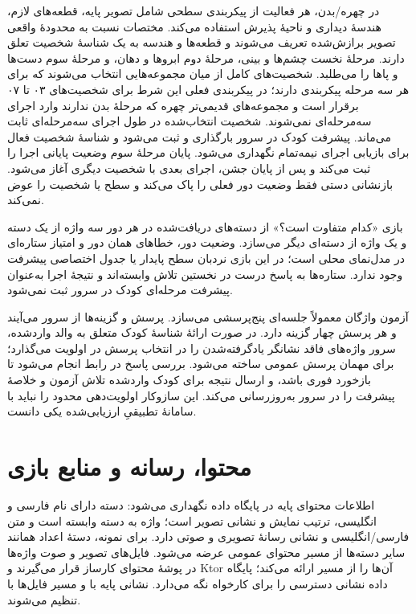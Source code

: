 در چهره/بدن، هر فعالیت از پیکربندی سطحی شامل تصویر پایه، قطعه‌های لازم، هندسهٔ دیداری و ناحیهٔ پذیرش استفاده می‌کند. مختصات نسبت به محدودهٔ واقعی تصویر برازش‌شده تعریف می‌شوند و قطعه‌ها و هندسه به یک شناسهٔ شخصیت تعلق دارند. مرحلهٔ نخست چشم‌ها و بینی، مرحلهٔ دوم ابروها و دهان، و مرحلهٔ سوم دست‌ها و پاها را می‌طلبد. شخصیت‌های کامل از میان مجموعه‌هایی انتخاب می‌شوند که برای هر سه مرحله پیکربندی دارند؛ در پیکربندی فعلی این شرط برای شخصیت‌های ۰۳ تا ۰۷ برقرار است و مجموعه‌های قدیمی‌تر چهره که مرحلهٔ بدن ندارند وارد اجرای سه‌مرحله‌ای نمی‌شوند. شخصیت انتخاب‌شده در طول اجرای سه‌مرحله‌ای ثابت می‌ماند. پیشرفت کودک در سرور بارگذاری و ثبت می‌شود و شناسهٔ شخصیت فعال برای بازیابی اجرای نیمه‌تمام نگهداری می‌شود. پایان مرحلهٔ سوم وضعیت پایانی اجرا را ثبت می‌کند و پس از پایان جشن، اجرای بعدی با شخصیت دیگری آغاز می‌شود. بازنشانی دستی فقط وضعیت دور فعلی را پاک می‌کند و سطح یا شخصیت را عوض نمی‌کند.

بازی «کدام متفاوت است؟» از دسته‌های دریافت‌شده در هر دور سه واژه از یک دسته و یک واژه از دسته‌ای دیگر می‌سازد. وضعیت دور، خطاهای همان دور و امتیاز ستاره‌ای در مدل‌نمای محلی است؛ در این بازی نردبان سطح پایدار یا جدول اختصاصی پیشرفت وجود ندارد. ستاره‌ها به پاسخ درست در نخستین تلاش وابسته‌اند و نتیجهٔ اجرا به‌عنوان پیشرفت مرحله‌ای کودک در سرور ثبت نمی‌شود.

آزمون واژگان معمولاً جلسه‌ای پنج‌پرسشی می‌سازد. پرسش و گزینه‌ها از سرور می‌آیند و هر پرسش چهار گزینه دارد. در صورت ارائهٔ شناسهٔ کودک متعلق به والد واردشده، سرور واژه‌های فاقد نشانگر یادگرفته‌شدن را در انتخاب پرسش در اولویت می‌گذارد؛ برای مهمان پرسش عمومی ساخته می‌شود. بررسی پاسخ در رابط انجام می‌شود تا بازخورد فوری باشد، و ارسال نتیجه برای کودک واردشده تلاش آزمون و خلاصهٔ پیشرفت را در سرور به‌روزرسانی می‌کند. این سازوکار اولویت‌دهی محدود را نباید با سامانهٔ تطبیقیِ ارزیابی‌شده یکی دانست.

\section{محتوا، رسانه و منابع بازی}

اطلاعات محتوای پایه در پایگاه داده نگهداری می‌شود: دسته دارای نام فارسی و انگلیسی، ترتیب نمایش و نشانی تصویر است؛ واژه به دسته وابسته است و متن فارسی/انگلیسی و نشانی رسانهٔ تصویری و صوتی دارد. برای نمونه، دستهٔ اعداد همانند سایر دسته‌ها از مسیر محتوای عمومی عرضه می‌شود. فایل‌های تصویر و صوت واژه‌ها در پوشهٔ محتوای کارساز قرار می‌گیرند و Ktor آن‌ها را از مسیر  ارائه می‌کند؛ پایگاه داده نشانی دسترسی را برای کارخواه نگه می‌دارد. نشانی پایه با  و مسیر فایل‌ها با  تنظیم می‌شوند.

